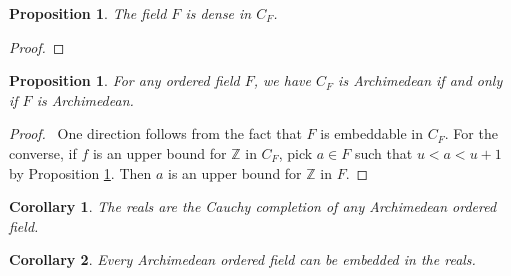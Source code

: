 \documentclass{article}
\let\qed\relax
\newtheorem{proposition}[axiom]{Proposition}
\newtheorem{corollary}{Corollary}[axiom]
\theoremstyle{definition}
\begin{document}
    \begin{proposition}
        \label{proposition:F_dense}
        The field $F$ is dense in $C_F$.
    \end{proposition}

    \begin{proof}
        \pf
        \qed
    \end{proof}

    \begin{proposition}
        For any ordered field $F$, we have $C_F$ is Archimedean if and only if $F$ is Archimedean.
    \end{proposition}

    \begin{proof}
        \pf\ One direction follows from the fact that $F$ is embeddable in $C_F$. For the converse, if $f$ is an upper bound for
        $\mathbb{Z}$ in $C_F$, pick $a \in F$ such that $u < a < u + 1$ by Proposition \ref{proposition:F_dense}. Then $a$ is an upper
        bound for $\mathbb{Z}$ in $F$. \qed
    \end{proof}

    \begin{corollary}
        The reals are the Cauchy completion of any Archimedean ordered field.
    \end{corollary}

    \begin{corollary}
        Every Archimedean ordered field can be embedded in the reals.
    \end{corollary}
\end{document}
